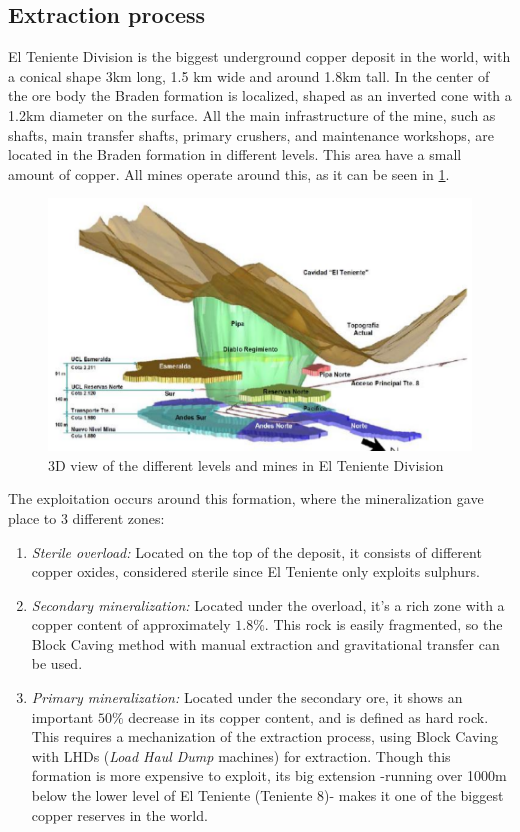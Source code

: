 \subsection{Extraction process}

El Teniente Division is the biggest underground copper deposit in the world, with a conical shape 3km long, 1.5 km wide and around 1.8km tall. In the center of the ore body the Braden formation is localized, shaped as an inverted cone with a 1.2km diameter on the surface. All the main infrastructure of the mine, such as shafts, main transfer shafts, primary crushers, and maintenance workshops, are located in the Braden formation in different levels. This area have a small amount of copper. All mines operate around this, as it can be seen in \ref{fig:teniente}.

\begin{figure}
    \centering
    \includegraphics[width=400pt]{img/teniente.png}
    \caption{3D view of the different levels and mines in El Teniente Division \cite{baraona}}
    \label{fig:teniente}
\end{figure}


The exploitation occurs around this formation, where the mineralization gave place to 3 different zones:
\begin{enumerate}
    \item \emph{Sterile overload:} Located on the top of the deposit, it consists of different copper oxides, considered sterile since El Teniente only exploits sulphurs. 
    \item \emph{Secondary mineralization:} Located under the overload, it's a rich zone with a copper content of approximately $1.8\%$. This rock is easily fragmented, so the Block Caving method with manual extraction and gravitational transfer can be used.
    \item \emph{Primary mineralization:} Located under the secondary ore, it shows an important $50\%$ decrease in its copper content, and is defined as hard rock. This requires a mechanization of the extraction process, using Block Caving with LHDs (\emph{Load Haul Dump} machines) for extraction. Though this formation is more expensive to exploit, its big extension -running over 1000m below the lower level of El Teniente (Teniente 8)- makes it one of the biggest copper reserves in the world.
\end{enumerate}

